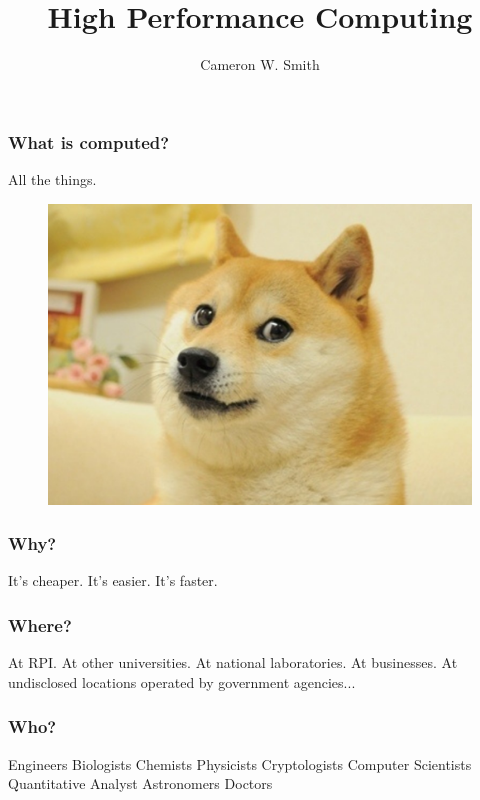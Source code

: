 \documentclass{beamer}
\begin{document}
\title[HPC]
{High Performance Computing}
\author[smithc11@rpi.edu]{Cameron W. Smith}

\begin{frame}[plain]
  \titlepage
\end{frame}

\begin{frame}
  \frametitle{What is computed?}
  \center All the things.
  \begin{figure} \centering
    \includegraphics[width=.8\textwidth]{figs/plainDogeZoom.png}
  \end{figure}
\end{frame}

\begin{frame}
  \frametitle{Why?}
  \center It's cheaper.
  \center It's easier.
  \center It's faster.
\end{frame}

\begin{frame}
  \frametitle{Where?}
  \center At RPI.
  \center At other universities.
  \center At national laboratories.
  \center At businesses.
  \center At undisclosed locations operated by government agencies...
\end{frame}

\begin{frame}
  \frametitle{Who?}
  \center Engineers
  \center Biologists
  \center Chemists
  \center Physicists
  \center Cryptologists
  \center Computer Scientists
  \center Quantitative Analyst
  \center Astronomers
  \center Doctors
\end{frame}
\end{document}
